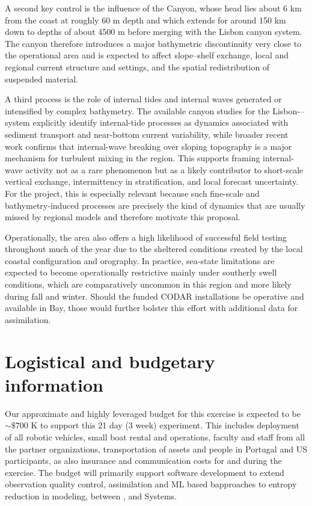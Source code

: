 A second key control is the influence of the \set Canyon, whose head
lies about 6 km from the coast at roughly 60 m depth and which extends
for around 150 km down to depths of about 4500 m before merging with
the Lisbon canyon system. The canyon therefore introduces a major
bathymetric discontinuity very close to the operational area and is
expected to affect slope–shelf exchange, local and regional current
structure and settings, and the spatial redistribution of suspended
material.

A third process is the role of internal tides and internal waves
generated or intensified by complex bathymetry. The available canyon
studies for the Lisbon-–\set system explicitly identify
internal-tide processes as dynamics associated with sediment transport
and near-bottom current variability, while broader recent work
confirms that internal-wave breaking over sloping topography is a
major mechanism for turbulent mixing in the region. This supports
framing internal-wave activity not as a rare phenomenon but as a
likely contributor to short-scale vertical exchange, intermittency in
stratification, and local forecast uncertainty. For the project, this
is especially relevant because such fine-scale and bathymetry-induced
processes are precisely the kind of dynamics that are usually missed
by regional models and therefore motivate this proposal.

Operationally, the area also offers a high likelihood of successful
field testing throughout much of the year due to the sheltered
conditions created by the local coastal configuration and
orography. In practice, sea-state limitations are expected to become
operationally restrictive mainly under southerly swell conditions,
which are comparatively uncommon in this region and more likely during
fall and winter. Should the \org funded CODAR installations be
operative and available in \set Bay, those would further bolster this
effort with additional data for assimilation.


\section*{Logistical and budgetary information}

Our approximate and highly leveraged budget for this exercise is
expected to be \textbf{$\sim \$700$} K to support this 21 day (3 week)
experiment. This includes deployment of all robotic vehicles, small
boat rental and operations, faculty and staff from all the partner
organizations, transportation of assets and people in Portugal and US
participants, as also insurance and communication costs for and during
the exercise. The budget will primarily support software development
to extend observation quality control, assimilation and ML based
bapproaches to entropy reduction in modeling, between \unive, \IST
and \now Systems.


